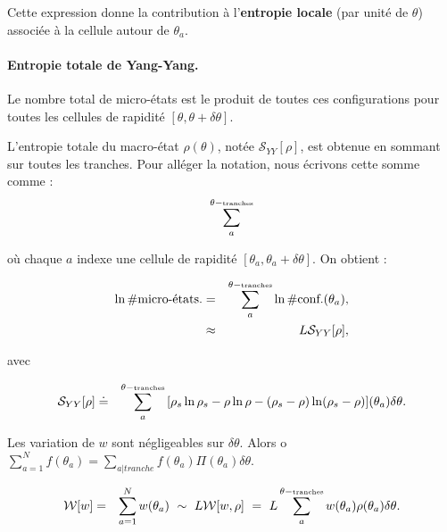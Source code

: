 Cette expression donne la contribution à l’{\bf entropie locale} (par unité de $\theta$) associée à la cellule autour de $\theta_a$.

\paragraph{Entropie totale de Yang-Yang.}
Le nombre total de micro-états est le produit de toutes ces configurations pour toutes les cellules de rapidité $[\theta, \theta + \delta \theta]$. %

L'entropie totale du macro-état $\rho(\theta)$, notée $\mathcal{S}_{YY}[\rho]$, est obtenue en sommant sur toutes les tranches. Pour alléger la notation, nous écrivons cette somme comme :
\begin{eqnarray}
	\sum_a^{\theta-\mbox{\tiny tranches}}	
\end{eqnarray}

où chaque $a$ indexe une cellule de rapidité $[\theta_a, \theta_a + \delta\theta]$.
On obtient :

\begin{eqnarray}
    \ln \# \mbox{micro-états.} & = & \sum_a^{\theta-\mbox{\tiny tranches}} \ln \# \mbox{conf.}(\theta_a), \\
    & \approx &   L\mathcal{S}_{YY} [ \rho ] , 	
\end{eqnarray}

avec 

\begin{eqnarray}
    \mathcal{S}_{YY}[\rho] & \doteq & \sum_a^{\theta-\mbox{\tiny tranches}} \, [ \rho_s\ln \rho_s - \rho \ln \rho - ( \rho_s - \rho ) \ln ( \rho_s - \rho ) ] (\theta_a) \delta \theta .
\end{eqnarray}
	
Les variation de $w$ sont négligeables sur $\delta \theta $. Alors o  $\sum_{a = 1}^N  f(\theta_a) = \sum_{a \vert tranche } f(\theta_a) \Pi( \theta_a)\delta \theta$.

\begin{eqnarray}
	 \mathcal{W}[w] & = & \sum_{a = 1}^N  w(\theta_a)	 ~ \sim ~ L\mathcal{W}[w,\rho] ~=~ L \sum_a^{\theta-\mbox{\tiny tranches}}	 w(\theta_a) \rho(\theta_a) \delta \theta.
\end{eqnarray}

